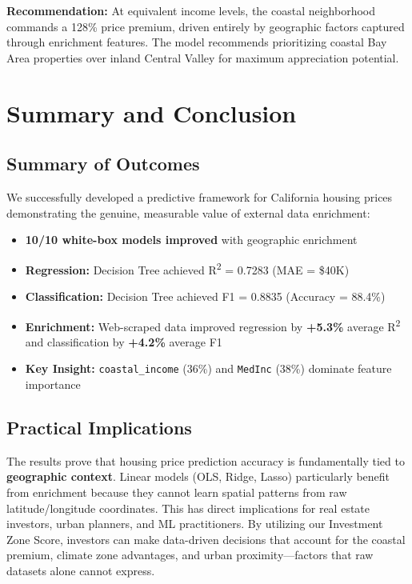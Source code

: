 \documentclass[12pt,a4paper]{article}
\begin{document}
\textbf{Recommendation:} At equivalent income levels, the coastal neighborhood commands a 128\% price premium, driven entirely by geographic factors captured through enrichment features. The model recommends prioritizing coastal Bay Area properties over inland Central Valley for maximum appreciation potential.

\newpage

\section{Summary and Conclusion}

\subsection{Summary of Outcomes}

We successfully developed a predictive framework for California housing prices demonstrating the genuine, measurable value of external data enrichment:

\begin{itemize}
    \item \textbf{10/10 white-box models improved} with geographic enrichment
    \item \textbf{Regression:} Decision Tree achieved R\textsuperscript{2} = 0.7283 (MAE = \$40K)
    \item \textbf{Classification:} Decision Tree achieved F1 = 0.8835 (Accuracy = 88.4\%)
    \item \textbf{Enrichment:} Web-scraped data improved regression by \textbf{+5.3\%} average R\textsuperscript{2} and classification by \textbf{+4.2\%} average F1
    \item \textbf{Key Insight:} \texttt{coastal\_income} (36\%) and \texttt{MedInc} (38\%) dominate feature importance
\end{itemize}

\subsection{Practical Implications}

The results prove that housing price prediction accuracy is fundamentally tied to \textbf{geographic context}. Linear models (OLS, Ridge, Lasso) particularly benefit from enrichment because they cannot learn spatial patterns from raw latitude/longitude coordinates. This has direct implications for real estate investors, urban planners, and ML practitioners. By utilizing our Investment Zone Score, investors can make data-driven decisions that account for the coastal premium, climate zone advantages, and urban proximity---factors that raw datasets alone cannot express.
\end{document}
